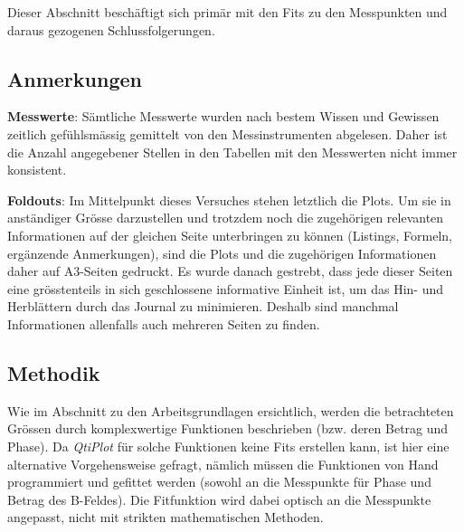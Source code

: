 Dieser Abschnitt besch\"aftigt  sich prim\"ar mit den Fits  zu den Messpunkten
und daraus gezogenen Schlussfolgerungen.

\subsection{Anmerkungen}
\label{sec:ausw:subsec:remarks}
\textbf{Messwerte}: S\"amtliche  Messwerte  wurden   nach  bestem  Wissen  und
Gewissen  zeitlich   gef\"uhlsm\"assig  gemittelt  von   den  Messinstrumenten
abgelesen. Daher ist  die Anzahl angegebener  Stellen in den Tabellen  mit den
Messwerten nicht immer konsistent.

\vspace{0.5em}

\noindent
\textbf{Foldouts}: Im  Mittelpunkt  dieses   Versuches  stehen  letztlich  die
Plots.  Um  sie in anst\"andiger  Gr\"osse darzustellen und trotzdem  noch die
zugeh\"origen relevanten Informationen auf  der gleichen Seite unterbringen zu
k\"onnen (Listings, Formeln, erg\"anzende Anmerkungen), sind die Plots und die
zugeh\"origen  Informationen daher  auf  A3-Seiten  gedruckt. Es wurde  danach
gestrebt, dass  jede dieser Seiten  eine gr\"osstenteils in  sich geschlossene
informative Einheit ist, um das  Hin- und  Herbl\"attern durch das  Journal zu
minimieren.   Deshalb sind  manchmal  Informationen  allenfalls auch  mehreren
Seiten zu finden.


\subsection{Methodik}
\label{sec:ausw:subsec:methodik}

Wie im Abschnitt zu den Arbeitsgrundlagen ersichtlich, werden die betrachteten
Gr\"ossen durch  komplexwertige Funktionen beschrieben (bzw.  deren Betrag und
Phase). Da \emph{QtiPlot}  f\"ur solche Funktionen keine  Fits erstellen kann,
ist  hier  eine alternative  Vorgehensweise  gefragt,  n\"amlich m\"ussen  die
Funktionen von Hand programmiert und gefittet werden (sowohl an die Messpunkte
f\"ur Phase  und Betrag des  B-Feldes). Die Fitfunktion wird dabei  optisch an
die Messpunkte angepasst, nicht mit strikten mathematischen Methoden.

